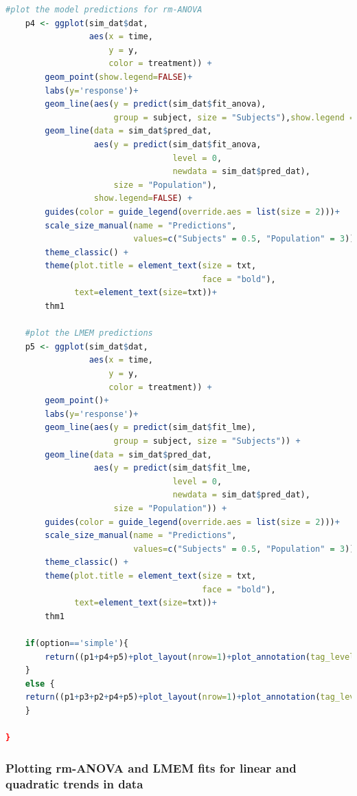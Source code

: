 \documentclass[
]{article}
\begin{document}
\begin{lstlisting}[language=R]
    #plot the model predictions for rm-ANOVA
    p4 <- ggplot(sim_dat$dat,
                 aes(x = time,
                     y = y,
                     color = treatment)) +
        geom_point(show.legend=FALSE)+
        labs(y='response')+
        geom_line(aes(y = predict(sim_dat$fit_anova),
                      group = subject, size = "Subjects"),show.legend = FALSE) +
        geom_line(data = sim_dat$pred_dat,
                  aes(y = predict(sim_dat$fit_anova,
                                  level = 0,
                                  newdata = sim_dat$pred_dat),
                      size = "Population"),
                  show.legend=FALSE) +
        guides(color = guide_legend(override.aes = list(size = 2)))+
        scale_size_manual(name = "Predictions",
                          values=c("Subjects" = 0.5, "Population" = 3)) +
        theme_classic() +
        theme(plot.title = element_text(size = txt,
                                        face = "bold"),
              text=element_text(size=txt))+
        thm1

    #plot the LMEM predictions
    p5 <- ggplot(sim_dat$dat,
                 aes(x = time,
                     y = y,
                     color = treatment)) +
        geom_point()+
        labs(y='response')+
        geom_line(aes(y = predict(sim_dat$fit_lme),
                      group = subject, size = "Subjects")) +
        geom_line(data = sim_dat$pred_dat,
                  aes(y = predict(sim_dat$fit_lme,
                                  level = 0,
                                  newdata = sim_dat$pred_dat),
                      size = "Population")) +
        guides(color = guide_legend(override.aes = list(size = 2)))+
        scale_size_manual(name = "Predictions",
                          values=c("Subjects" = 0.5, "Population" = 3)) +
        theme_classic() +
        theme(plot.title = element_text(size = txt,
                                        face = "bold"),
              text=element_text(size=txt))+
        thm1

    if(option=='simple'){
        return((p1+p4+p5)+plot_layout(nrow=1)+plot_annotation(tag_levels = 'A'))
    }
    else {
    return((p1+p3+p2+p4+p5)+plot_layout(nrow=1)+plot_annotation(tag_levels = 'A'))
    }

}
\end{lstlisting}

\hypertarget{plotting-rm-anova-and-lmem-fits-for-linear-and-quadratic-trends-in-data}{%
\subsubsection{Plotting rm-ANOVA and LMEM fits for linear and quadratic trends in data}\label{plotting-rm-anova-and-lmem-fits-for-linear-and-quadratic-trends-in-data}}
\end{document}
